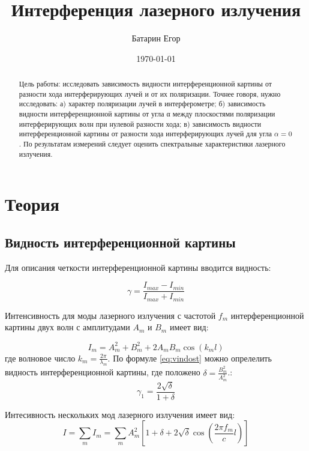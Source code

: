 \documentclass[a4paper,12pt]{article}
\author{Батарин Егор}
\title{Интерференция лазерного излучения}
\date{\today}
\begin{document}
 
\maketitle
 
\begin{abstract}
   Цель работы: исследовать зависимость видности интерференционной картины от разности хода интерферирующих лучей и от их поляризации. Точнее говоря, нужно исследовать: 
а) характер поляризации лучей
в интерферометре; б) зависимость видности интерференционной
картины от угла
α между плоскостями поляризации интерферирующих волн
при нулевой разности
хода; в) зависимость видности интерференционной
картины от разности
хода интерферирующих лучей для угла $\alpha = 0$. По
результатам измерений следует оценить спектральные
характеристики
лазерного излучения.
\end{abstract}
\section{Теория}
\subsection{Видность интерференционной картины}
Для описания четкости интерференционной картины вводится видность:

\begin{equation}\label{eq:vindost}
\gamma = \frac{I_{max} - I_{min}}{I_{max}+I_{min}}
\end{equation}

Интенсивность для моды лазерного излучения с частотой $f_m$ интерференционной картины двух волн с амплитудами $A_m$ и $B_m$ имеет вид:

\begin{equation}\label{eq:intes}
I_m = A^2_m + B^2_m + 2A_mB_m\cos (k_ml)
\end{equation}
где волновое число $k_m = \frac{2\pi}{\lambda_m}$.
По формуле \eqref{eq:vindost} можно опрелелить видность интерференционной картины, где положено $\delta = \frac{B^2_m}{A^2_m}$.:
\begin{equation}\label{eq:vidnost2}
\gamma_1=\frac{2\sqrt{\delta}}{1+\delta}
\end{equation}


Интесивность нескольких мод лазерного излучения имеет вид:
\begin{equation}\label{eq:sumintes}
I = \sum\limits_m I_m = \sum\limits_m A^2_m\left[ 1 + \delta + 2\sqrt{\delta}\cos{\left(\frac{2\pi f_m}{c}l\right)}\right]
\end{equation}
\end{document}
